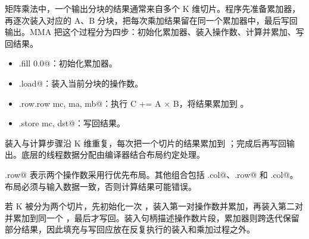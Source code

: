 矩阵乘法中，一个输出分块的结果通常来自多个 K 维切片。程序先准备累加器，再逐次装入对应的 A、B 分块，把每次乘加结果留在同一个累加器中，最后写回输出。MMA 把这个过程分为四步：初始化累加器、装入操作数、计算并累加、写回结果。

\begin{itemize}[leftmargin=1.6em]
\item \co@mma.fill 0.0@：初始化累加器。
\item \co@mma.load@：装入当前分块的操作数。
\item \co@mma.row.row mc, ma, mb@：执行 C += A × B，将结果累加到 \co@mc@。
\item \co@mma.store mc, dst@：写回结果。
\end{itemize}

装入与计算步骤沿 K 维重复，每次把一个切片的结果累加到 \co@mc@；完成后再写回输出。底层的线程数据分配由编译器结合布局约定处理。

\co@row.row@ 表示两个操作数采用行优先布局。其他组合包括 \co@row.col@、\co@col.row@ 和 \co@col.col@。布局必须与输入数据一致，否则计算结果可能错误。

若 K 被分为两个切片，先初始化一次 \co@mc@，装入第一对操作数并累加，再装入第二对并累加到同一个 \co@mc@，最后才写回。装入句柄描述操作数片段，累加器则跨迭代保留部分结果，因此填充与写回应放在反复执行的装入和乘加过程之外。

